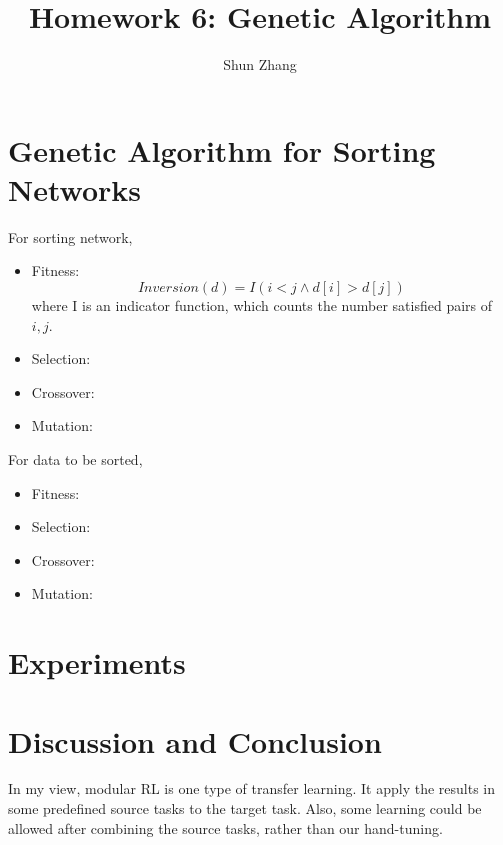\documentclass[11pt]{article}
\title{Homework 6: Genetic Algorithm}
\author{Shun Zhang}
\date{}
\begin{document}
\maketitle

\section{Genetic Algorithm for Sorting Networks}

For sorting network,

\begin{itemize}
\item Fitness:
$$Inversion(d) = I(i < j \land d[i] > d[j])$$
where I is an indicator function, which counts the number satisfied
pairs of $i, j$.
\item Selection:
\item Crossover:
\item Mutation:
\end{itemize}

For data to be sorted,

\begin{itemize}
\item Fitness:
\item Selection:
\item Crossover:
\item Mutation:
\end{itemize}

\section{Experiments}

\section{Discussion and Conclusion}

In my view, modular RL is one type of transfer learning. It apply the
results in some predefined source tasks to the target task. Also, some
learning could be allowed after combining the source tasks, rather
than our hand-tuning.
\end{document}
